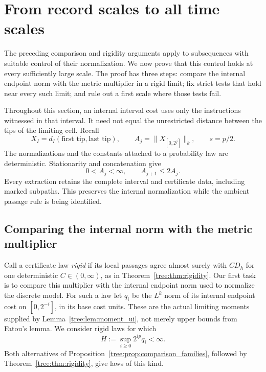 \section{From record scales to all time scales}
\label{tree:sec:bootstrap}

The preceding comparison and rigidity arguments apply to subsequences
with suitable control of their normalization.  We now prove that this
control holds at every sufficiently large scale.  The proof has three
steps: compare the internal endpoint norm with the metric multiplier
in a rigid limit; fix strict tests that hold near every such limit;
and rule out a first scale where those tests fail.

Throughout this section, an internal interval cost uses only the
instructions witnessed in that interval.  It need not equal the
unrestricted distance between the tips of the limiting cell.  Recall
\[
 X_I=d_I(\text{first tip},\text{last tip}),\qquad
 A_j=\|X_{[0,2^j]}\|_k,\qquad s=p/2.
\]
The normalizations and the constants attached to a probability law
are deterministic.  Stationarity and concatenation give
\begin{equation}
 0<A_j<\infty,\qquad A_{j+1}\leq 2A_j .
 \label{tree:eq:bootstrap_elementary_growth}
\end{equation}
Every extraction retains the complete interval and certificate data,
including marked subpaths.  This preserves the internal normalization
while the ambient passage rule is being identified.

\subsection{Comparing the internal norm with the metric multiplier}

Call a certificate law \emph{rigid} if its local passages agree
almost surely with $C D_h$ for one deterministic $C\in(0,\infty)$,
as in Theorem~\ref{tree:thm:rigidity}.  Our first task is to compare
this multiplier with the internal endpoint norm used to normalize
the discrete model.
For such a law let $q_i$ be the $L^k$ norm of its internal endpoint
cost on $[0,2^{-i}]$, in its base cost units.  These are the actual
limiting moments supplied by Lemma~\ref{tree:lem:moment_ui}, not merely
upper bounds from Fatou's lemma.  We consider rigid laws for which
\begin{equation}
 H:=\sup_{i\geq0}2^{ip}q_i<\infty.
 \label{tree:eq:bootstrap_H}
\end{equation}
Both alternatives of Proposition~\ref{tree:prop:comparison_families},
followed by Theorem~\ref{tree:thm:rigidity}, give laws of this kind.

